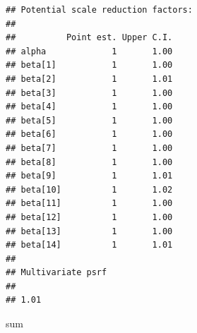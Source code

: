 \documentclass[
]{article}
\newenvironment{Shaded}{\begin{snugshade}}{\end{snugshade}}
\newcommand{\NormalTok}[1]{#1}
\begin{document}
\begin{verbatim}
## Potential scale reduction factors:
## 
##          Point est. Upper C.I.
## alpha             1       1.00
## beta[1]           1       1.00
## beta[2]           1       1.01
## beta[3]           1       1.00
## beta[4]           1       1.00
## beta[5]           1       1.00
## beta[6]           1       1.00
## beta[7]           1       1.00
## beta[8]           1       1.00
## beta[9]           1       1.01
## beta[10]          1       1.02
## beta[11]          1       1.00
## beta[12]          1       1.00
## beta[13]          1       1.00
## beta[14]          1       1.01
## 
## Multivariate psrf
## 
## 1.01
\end{verbatim}

\begin{Shaded}
\begin{Highlighting}[]
\NormalTok{sum}
\end{Highlighting}
\end{Shaded}
\end{document}
